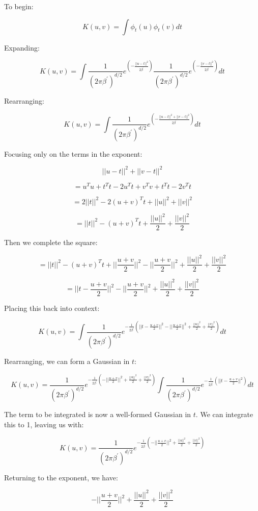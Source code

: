 \documentclass[11pt]{article}
\begin{document}
To begin:

\[
K(u, v) = \int \phi_t(u) \phi_t(v) dt
\]

Expanding:

\[
K(u, v) = \int \frac{1}{(2\pi\beta^\prime)^{d/2}}e^{({- \frac{||u - t||^2}{2\beta^\prime}})} \frac{1}{(2\pi\beta^\prime)^{d/2}}e^{({- \frac{||v - t||^2}{2\beta^\prime}})} dt
\]

Rearranging:

\[
K(u, v) = \int \frac{1}{(2\pi\beta^\prime)^{d/2}}e^{({- \frac{||u - t||^2 + ||v - t||^2}{2\beta^\prime}})} dt
\]

Focusing only on the terms in the exponent:

\[
||u - t||^2 + ||v - t||^2
\]

\[
= u^Tu + t^Tt - 2u^Tt + v^Tv + t^Tt - 2v^Tt
\]

\[
= 2||t||^2 - 2(u + v)^Tt + ||u||^2 + ||v||^2
\]

\[
= ||t||^2 - (u + v)^Tt + \frac{||u||^2}{2} + \frac{||v||^2}{2}
\]

Then we complete the square:

\[
= ||t||^2 - (u + v)^Tt + ||\frac{u+v}{2}||^2 -  ||\frac{u+v}{2}||^2 + \frac{||u||^2}{2} + \frac{||v||^2}{2}
\]

\[
= ||t - \frac{u + v}{2}||^2 - ||\frac{u+v}{2}||^2 + \frac{||u||^2}{2} + \frac{||v||^2}{2}
\]

Placing this back into context:

\[
K(u, v) = \int \frac{1}{(2\pi\beta^\prime)^{d/2}}e^{-\frac{1}{2\beta^\prime}(||t - \frac{u + v}{2}||^2 - ||\frac{u+v}{2}||^2 + \frac{||u||^2}{2} + \frac{||v||^2}{2})} dt
\]

Rearranging, we can form a Gaussian in $t$:

\[
K(u, v) = \frac{1}{(2\pi\beta^\prime)^{d/2}}e^{-\frac{1}{2\beta^\prime}(- ||\frac{u+v}{2}||^2 + \frac{||u||^2}{2} + \frac{||v||^2}{2})} \int \frac{1}{(2\pi\beta^\prime)^{d/2}}e^{-\frac{1}{2\beta^\prime}(||t - \frac{u + v}{2}||^2)} dt
\]

The term to be integrated is now a well-formed Gaussian in $t$. We can integrate this to 1, leaving us with:

\[
K(u, v) = \frac{1}{(2\pi\beta^\prime)^{d/2}}e^{-\frac{1}{2\beta^\prime}(- ||\frac{u+v}{2}||^2 + \frac{||u||^2}{2} + \frac{||v||^2}{2})}
\]

Returning to the exponent, we have:

\[
- ||\frac{u+v}{2}||^2 + \frac{||u||^2}{2} + \frac{||v||^2}{2}
\]
\end{document}
